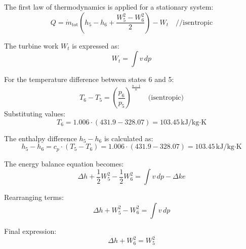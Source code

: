 The first law of thermodynamics is applied for a stationary system:  
\[
Q = \dot{m}_{\text{tot}} \left( h_5 - h_6 + \frac{W_5^2 - W_6^2}{2} \right) - W_t \quad \text{//isentropic}
\]  

The turbine work \( W_t \) is expressed as:  
\[
W_t = \int v \, dp
\]  

For the temperature difference between states 6 and 5:  
\[
T_6 - T_5 = \left( \frac{p_6}{p_5} \right)^{\frac{n-1}{n}} \quad \text{(isentropic)}
\]  
Substituting values:  
\[
T_6 = 1.006 \cdot (431.9 - 328.07) = 103.45 \, \text{kJ/kg·K}
\]  

The enthalpy difference \( h_5 - h_6 \) is calculated as:  
\[
h_5 - h_6 = c_p \cdot (T_5 - T_6) = 1.006 \cdot (431.9 - 328.07) = 103.45 \, \text{kJ/kg·K}
\]  

The energy balance equation becomes:  
\[
\Delta h + \frac{1}{2} W_5^2 - \frac{1}{2} W_6^2 = \int v \, dp - \Delta ke
\]  

Rearranging terms:  
\[
\Delta h + W_5^2 - W_6^2 = \int v \, dp
\]  

Final expression:  
\[
\Delta h + W_6^2 = W_5^2
\]